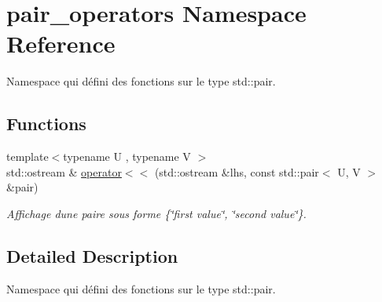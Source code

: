 \hypertarget{namespacepair__operators}{}\section{pair\+\_\+operators Namespace Reference}
\label{namespacepair__operators}


Namespace qui défini des fonctions sur le type std\+::pair.  


\subsection*{Functions}
\begin{DoxyCompactItemize}
\item 
\mbox{\label{namespacepair__operators_a115d8bbb7c2e8a55ff76ead25ea47da5}} 
{\footnotesize template$<$typename U , typename V $>$ }\\std\+::ostream \& \hyperlink{namespacepair__operators_a115d8bbb7c2e8a55ff76ead25ea47da5}{operator$<$$<$} (std\+::ostream \&lhs, const std\+::pair$<$ U, V $>$ \&pair)
\begin{DoxyCompactList}\small\item\em Affichage d\textquotesingle{}une paire sous forme \{\char`\"{}first value\char`\"{}, \char`\"{}second value\char`\"{}\}. \end{DoxyCompactList}\end{DoxyCompactItemize}


\subsection{Detailed Description}
Namespace qui défini des fonctions sur le type std\+::pair. 